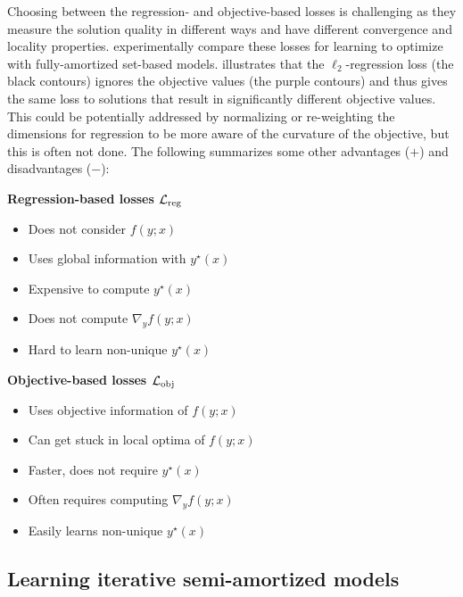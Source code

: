 \documentclass[twoside,11pt]{article}
\newcommand\pro{\item[$+$]}
\newcommand\con{\item[$-$]}
\begin{document}
Choosing between the regression- and objective-based losses
is challenging as they measure the solution quality in
different ways and have different convergence and
locality properties.
\citet{liu2022teaching} experimentally compare these
losses for learning to optimize with fully-amortized set-based models.
 illustrates that the $\ell_2$-regression
loss (the black contours) ignores the objective
values (the purple contours) and thus gives the same loss
to solutions that result in significantly different
objective values.
This could be potentially addressed by normalizing or
re-weighting the dimensions for regression to be more aware
of the curvature of the objective, but this is often not done.
The following summarizes some other advantages ($+$) and
disadvantages ($-$):
\vspace{6mm}

\noindent
\begin{minipage}[t]{0.5\textwidth}
\noindent\textbf{Regression-based losses ${\mathcal{L}}_{\rm reg}$}
\begin{itemize}[leftmargin=*,noitemsep]
\con Does not consider $f(y; x)$
\pro Uses global information with $y^\star(x)$
\con Expensive to compute $y^\star(x)$
\pro Does not compute $\nabla_y f(y; x)$
\con Hard to learn non-unique $y^\star(x)$
\end{itemize}
\end{minipage}
\begin{minipage}[t]{0.5\textwidth}
\textbf{Objective-based losses ${\mathcal{L}}_{\rm obj}$}
\begin{itemize}[leftmargin=*,noitemsep]
\pro Uses objective information of $f(y; x)$
\con Can get stuck in local optima of $f(y; x)$
\pro Faster, does not require $y^\star(x)$
\con Often requires computing $\nabla_y f(y; x)$
\pro Easily learns non-unique $y^\star(x)$
\end{itemize}
\end{minipage}

\subsection{Learning iterative semi-amortized models}
\label{sec:learning:iter}
\end{document}
